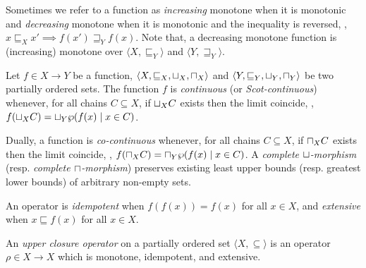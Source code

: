 Sometimes we refer to a function as \emph{increasing} monotone when it is monotonic and \emph{decreasing} monotone when it is monotonic and the inequality is reversed, \ie, $x \sqsubseteq_X x' \implies f(x') \sqsupseteq_Y f(x)$. Note that, a decreasing monotone function is (increasing) monotone over $\langle X, \sqsubseteq_Y \rangle$ and $\langle Y, \sqsupseteq_Y \rangle$.

\begin{definition}[Continuity]
  Let $f\in X \to Y$ be a function, $\langle X, \sqsubseteq_X, \sqcup_X, \sqcap_X \rangle$ and $\langle Y, \sqsubseteq_Y, \sqcup_Y, \sqcap_Y \rangle$ be two partially ordered sets.
  The function $f$ is \emph{continuous} (or \emph{Scot-continuous}) whenever, for all chains $C \subseteq X$, if $\sqcup_X C$ exists then the limit coincide, \ie, $f(\sqcup_X C) = \sqcup_Y \wp(f(x) \mid x \in C)$.
\end{definition}

Dually, a function is \emph{co-continuous} whenever, for all chains $C \subseteq X$, if $\sqcap_X C$ exists then the limit coincide, \ie, $f(\sqcap_X C) = \sqcap_Y \wp(f(x) \mid x \in C)$. A \emph{complete $\sqcup$-morphism} (resp. \emph{complete $\sqcap$-morphism}) preserves existing least upper bounds (resp. greatest lower bounds) of arbitrary non-empty sets.


An operator is \emph{idempotent} when $f(f(x)) = f(x)$ for all $x \in X$, and \emph{extensive} when $x \sqsubseteq f(x)$ for all $x \in X$.

\begin{definition}
  An \emph{upper closure operator} on a partially ordered set $\langle X, \subseteq \rangle$ is an operator $\rho\in X \to X$ which is monotone, idempotent, and extensive.
\end{definition}

